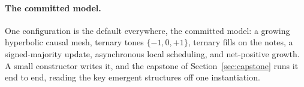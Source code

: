 \paragraph{The committed model.}
One configuration is the default everywhere, the committed model: a growing hyperbolic causal mesh,
ternary tones $\{-1,0,+1\}$, ternary fills on the notes, a signed-majority update, asynchronous
local scheduling, and net-positive growth. A small constructor writes it, and the capstone of
Section~\ref{sec:capstone} runs it end to end, reading the key emergent structures off one
instantiation.
